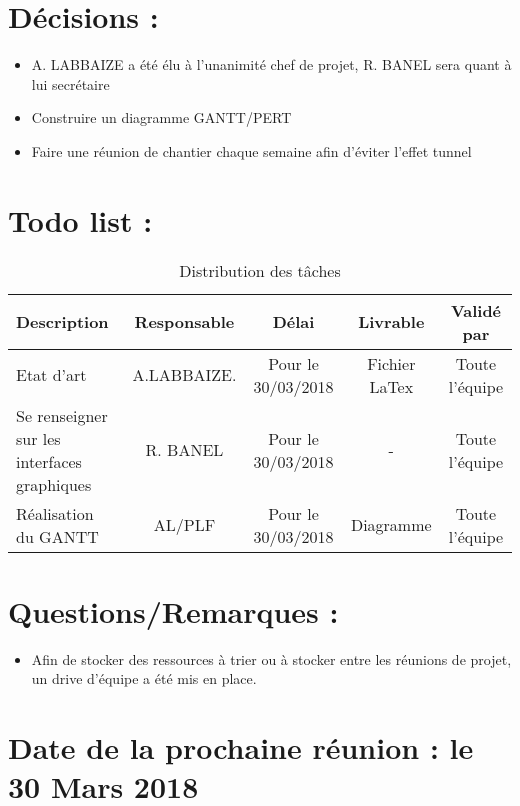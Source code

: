 \documentclass[11pt]{meetingmins}
\begin{document}
\section{Décisions : }
\begin{itemize}
    \item A. LABBAIZE a été élu à l'unanimité chef de projet, R. BANEL sera quant à lui secrétaire
    \item Construire un diagramme GANTT/PERT
    \item Faire une réunion de chantier chaque semaine afin d'éviter l'effet tunnel
    \end{itemize}
\section{Todo list :}
\begin{table}[h]
    \centering
    \begin{tabular}{|p{4cm}|c|c|c|c|}
    \hline
        \rowcolor{yellow} Description & Responsable & Délai & Livrable & Validé par
        \tabularnewline \hline
        Etat d'art & A.LABBAIZE. & Pour le 30/03/2018 & Fichier LaTex & Toute l'équipe
        \tabularnewline \hline
        Se renseigner sur les interfaces graphiques & R. BANEL & Pour le 30/03/2018 & - & Toute l'équipe
        \tabularnewline \hline
        Réalisation du GANTT  & AL/PLF & Pour le 30/03/2018 & Diagramme & Toute l'équipe \tabularnewline \hline 
        
        
    \end{tabular}
    \caption{Distribution des tâches}
    \label{tab:my_label}
\end{table}

\section{Questions/Remarques :}
\begin{itemize}
    \item Afin de stocker des ressources à trier ou à stocker entre les réunions de projet, un drive d'équipe a été mis en place.
\end{itemize}
\section{Date de la prochaine réunion : \textnormal{le 30 Mars 2018} }
\end{document}
